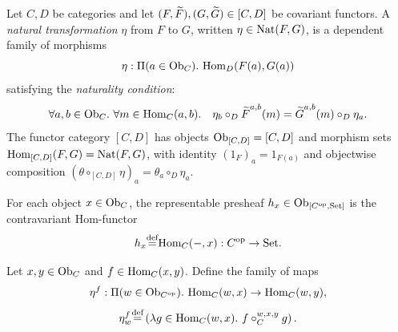 \documentclass[10pt,a4paper]{article}
\begin{document}
\myqed
\begin{definition}
Let $C, D$ be categories and let $(F, {\widetilde{F}\textrm{}}), (G, {\widetilde{G}\textrm{}}) \in [C, D]$ be covariant functors. A \emph{natural transformation} $\eta$ from $F$ to $G$, written $\eta \in {\textrm{Nat}}(F, G)$, is a dependent family of morphisms
$$\eta : \Pi(a \in {\textrm{Ob}}_C).\ {\textrm{Hom}}_D(F(a), G(a))$$
satisfying the \emph{naturality condition}:
$$\forall a, b \in \Ob_C.\ \forall m \in \Hom_C(a,b).\quad \eta_b \circ_D \FMor^{a,b}(m) = \GMor^{a,b}(m) \circ_D \eta_a.$$
The functor category $[C, D]$ has objects ${\textrm{Ob}}_{[C,D]} = [C,D]$ and morphism sets ${\textrm{Hom}}_{[C,D]}(F,G) = {\textrm{Nat}}(F,G)$, with identity $\left(1_F\right)_a = 1_{F(a)}$ and objectwise composition $(\theta \circ_{[C,D]} \eta)_a = \theta_a \circ_D \eta_a$.
\end{definition}

\begin{definition}
For each object $x \in {\textrm{Ob}}_C$, the representable presheaf $h_x \in {\textrm{Ob}}_{[C^{\textrm{op}},{\textrm{Set}}]}$ is the contravariant Hom-functor
$$h_x {\stackrel{{\textrm{def}}}{=}} {\textrm{Hom}}_C(-, x) : C^{\textrm{op}} \to {\textrm{Set}}.$$
\end{definition}

\begin{definition}
Let $x, y \in {\textrm{Ob}}_C$ and $f \in {\textrm{Hom}}_C(x,y)$. Define the family of maps
$$\eta^f : \Pi(w\in \Ob_{C^\op}).\ \Hom_C(w,x)\to \Hom_C(w,y),$$
$$\eta^f_w \eqdef \left(\lambda g\in\Hom_C(w,x).\ f\circ_C^{w,x,y} g\right).$$
\end{definition}
\end{document}
